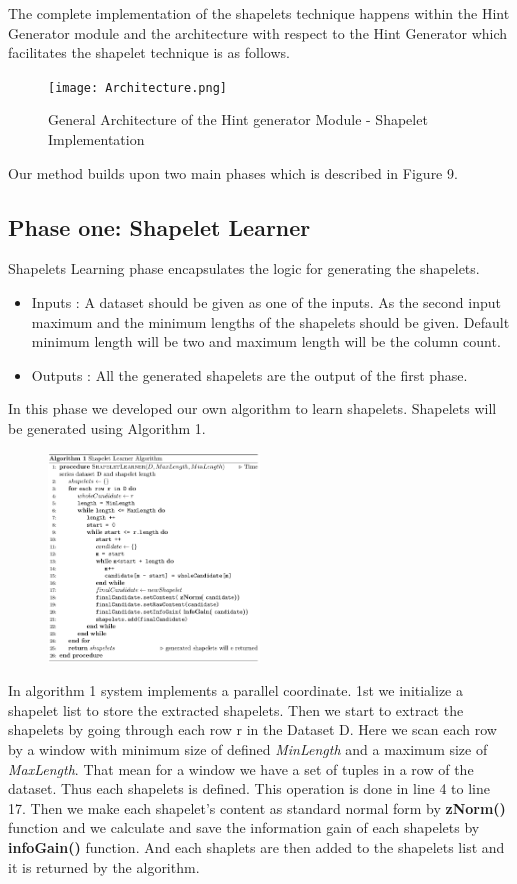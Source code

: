 \documentclass[conference]{IEEEtran}  %
\begin{document}
The complete implementation of the shapelets technique happens within the Hint Generator module and the architecture with respect to the Hint Generator which facilitates the shapelet technique is as follows.

\begin{figure}[h!]
\texttt{[image: Architecture.png]}
\caption{General Architecture of the Hint generator Module - Shapelet Implementation}
\end{figure}

Our method builds upon two main phases which is described in Figure 9.

\subsection{Phase one: Shapelet Learner}
Shapelets Learning phase encapsulates the logic for generating the shapelets.
\begin{itemize}
\item Inputs : A dataset should be given as one of the inputs. As the second input maximum and the minimum lengths of the shapelets should be given. Default minimum length will be two and maximum length will be the column count.
\item Outputs : All the generated shapelets are the output of the first phase.
\end{itemize}

In this phase we developed our own algorithm to learn shapelets. Shapelets will be generated using Algorithm 1.

\begin{figure}[h!]
\includegraphics[width=0.5\textwidth]{algo1.png}
\end{figure}


In algorithm 1 system implements a parallel coordinate. 1st we initialize a shapelet list to store the extracted shapelets. Then we start to extract the shapelets by going through each row r in the Dataset D. Here we scan each row by a window with minimum size of defined \textit{MinLength} and a maximum size of \textit{MaxLength}. That mean for a window we have a set of tuples in a row of the dataset. Thus each shapelets is defined. This operation is done in line 4 to line 17. Then we make each shapelet’s content as standard normal form by \textbf{zNorm()} function and we calculate and save the information gain of each shapelets by \textbf{infoGain()} function. And each shaplets are then added to the shapelets list and it is returned by the algorithm.
\end{document}

